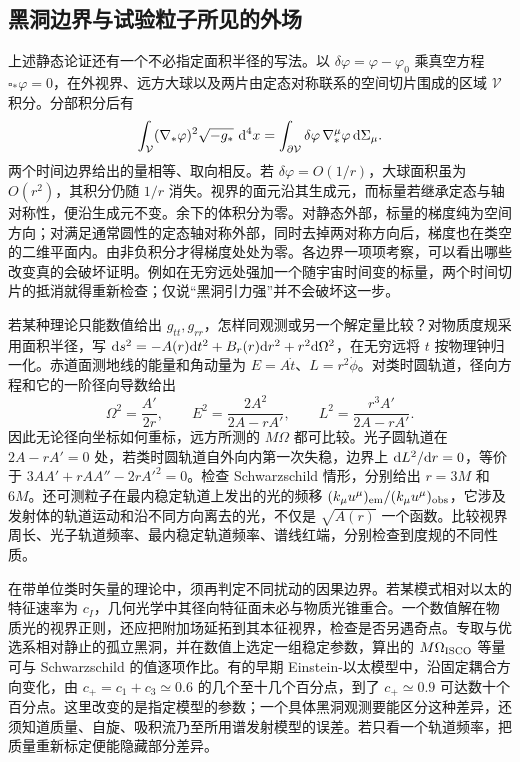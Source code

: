 \subsection{黑洞边界与试验粒子所见的外场}

上述静态论证还有一个不必指定面积半径的写法。以 $\delta\varphi=\varphi-\varphi_0$ 乘真空方程 $\square_*\varphi=0$，在外视界、远方大球以及两片由定态对称联系的空间切片围成的区域 $\mathcal V$ 积分。分部积分后有
\[
 \int_{\mathcal V}(\nabla_*\varphi)^2\sqrt{-g_*}\,\dd[4]{x}
   =\int_{\partial\mathcal V}\delta\varphi\,\nabla_*^\mu\varphi\,\dd\Sigma_\mu .
\]
两个时间边界给出的量相等、取向相反。若 $\delta\varphi=O(1/r)$，大球面积虽为 $O(r^2)$，其积分仍随 $1/r$ 消失。视界的面元沿其生成元，而标量若继承定态与轴对称性，便沿生成元不变。余下的体积分为零。对静态外部，标量的梯度纯为空间方向；对满足通常圆性的定态轴对称外部，同时去掉两对称方向后，梯度也在类空的二维平面内。由非负积分才得梯度处处为零。各边界一项项考察，可以看出哪些改变真的会破坏证明。例如在无穷远处强加一个随宇宙时间变的标量，两个时间切片的抵消就得重新检查；仅说“黑洞引力强”并不会破坏这一步。

若某种理论只能数值给出 $g_{tt},g_{rr}$，怎样同观测或另一个解定量比较？对物质度规采用面积半径，写 $\dd s^2=-A(r)\dd t^2+B_r(r)\dd r^2+r^2\dd\Omega^2$，在无穷远将 $t$ 按物理钟归一化。赤道面测地线的能量和角动量为 $E=A\dot t$、$L=r^2\dot\phi$。对类时圆轨道，径向方程和它的一阶径向导数给出
\[
 \Omega^2=\frac{A'}{2r},\qquad
 E^2=\frac{2A^2}{2A-rA'},\qquad
 L^2=\frac{r^3A'}{2A-rA'} .
\]
因此无论径向坐标如何重标，远方所测的 $M\Omega$ 都可比较。光子圆轨道在 $2A-rA'=0$ 处，若类时圆轨道自外向内第一次失稳，边界上 $\dd L^2/\dd r=0$，等价于 $3AA'+rAA''-2rA'^2=0$。检查 Schwarzschild 情形，分别给出 $r=3M$ 和 $6M$。还可测粒子在最内稳定轨道上发出的光的频移 $(k_\mu u^\mu)_{\rm em}/(k_\mu u^\mu)_{\rm obs}$，它涉及发射体的轨道运动和沿不同方向离去的光，不仅是 $\sqrt{A(r)}$ 一个函数。比较视界周长、光子轨道频率、最内稳定轨道频率、谱线红端，分别检查到度规的不同性质。

在带单位类时矢量的理论中，须再判定不同扰动的因果边界。若某模式相对以太的特征速率为 $c_I$，几何光学中其径向特征面未必与物质光锥重合。一个数值解在物质光的视界正则，还应把附加场延拓到其本征视界，检查是否另遇奇点。专取与优选系相对静止的孤立黑洞，并在数值上选定一组稳定参数，算出的 $M\Omega_{\rm ISCO}$ 等量可与 Schwarzschild 的值逐项作比。有的早期 Einstein-以太模型中，沿固定耦合方向变化，由 $c_+=c_1+c_3\simeq0.6$ 的几个至十几个百分点，到了 $c_+\simeq0.9$ 可达数十个百分点。这里改变的是指定模型的参数；一个具体黑洞观测要能区分这种差异，还须知道质量、自旋、吸积流乃至所用谱发射模型的误差。若只看一个轨道频率，把质量重新标定便能隐藏部分差异。

